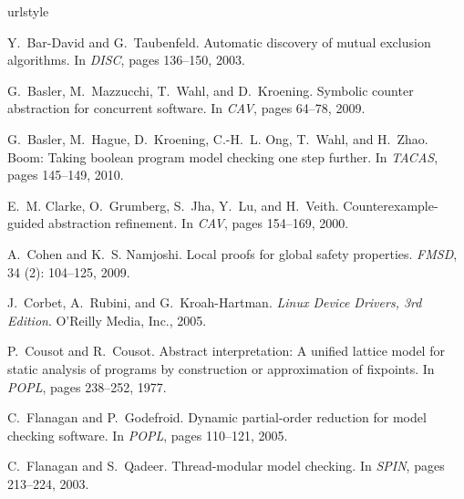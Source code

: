 \documentclass{sigplanconf}
\begin{document}
\begin{thebibliography}{34}
\providecommand{\natexlab}[1]{#1}
\providecommand{\url}[1]{\texttt{#1}}
\expandafter\ifx\csname urlstyle\endcsname\relax
  \providecommand{\doi}[1]{doi: #1}\else
  \providecommand{\doi}{doi: \begingroup \urlstyle{rm}\Url}\fi

Y.~Bar-David and G.~Taubenfeld.
\newblock Automatic discovery of mutual exclusion algorithms.
\newblock In \emph{DISC}, pages 136--150, 2003.

G.~Basler, M.~Mazzucchi, T.~Wahl, and D.~Kroening.
\newblock Symbolic counter abstraction for concurrent software.
\newblock In \emph{CAV}, pages 64--78, 2009.

G.~Basler, M.~Hague, D.~Kroening, C.-H.~L. Ong, T.~Wahl, and H.~Zhao.
\newblock Boom: Taking boolean program model checking one step further.
\newblock In \emph{TACAS}, pages 145--149, 2010.

E.~M. Clarke, O.~Grumberg, S.~Jha, Y.~Lu, and H.~Veith.
\newblock Counterexample-guided abstraction refinement.
\newblock In \emph{CAV}, pages 154--169, 2000.

A.~Cohen and K.~S. Namjoshi.
\newblock Local proofs for global safety properties.
\newblock \emph{FMSD}, 34 (2): 104--125, 2009.

J.~Corbet, A.~Rubini, and G.~Kroah-Hartman.
\newblock \emph{Linux Device Drivers, 3rd Edition}.
\newblock O'Reilly Media, Inc., 2005.

P.~Cousot and R.~Cousot.
\newblock Abstract interpretation: A unified lattice model for static analysis
  of programs by construction or approximation of fixpoints.
\newblock In \emph{POPL}, pages 238--252, 1977.

C.~Flanagan and P.~Godefroid.
\newblock Dynamic partial-order reduction for model checking software.
\newblock In \emph{POPL}, pages 110--121, 2005.

C.~Flanagan and S.~Qadeer.
\newblock Thread-modular model checking.
\newblock In \emph{SPIN}, pages 213--224, 2003.


\end{thebibliography}
\end{document}
